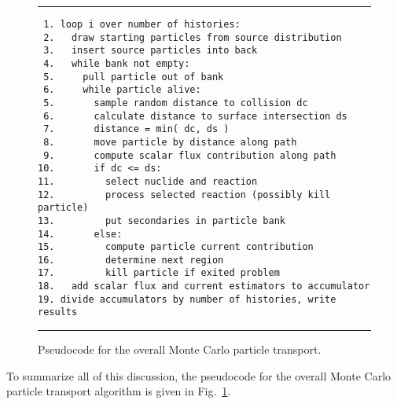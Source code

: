 \begin{figure}[tb!]
\begin{center}
\noindent \rule{\textwidth}{1pt}
\begin{verbatim}
 1. loop i over number of histories:
 2.   draw starting particles from source distribution
 3.   insert source particles into back
 4.   while bank not empty:
 5.     pull particle out of bank
 6.     while particle alive:
 5.       sample random distance to collision dc
 6.       calculate distance to surface intersection ds
 7.       distance = min( dc, ds )
 8.       move particle by distance along path
 9.       compute scalar flux contribution along path
10.       if dc <= ds:        
11.         select nuclide and reaction
12.         process selected reaction (possibly kill particle)
13.         put secondaries in particle bank
14.       else:
15.         compute particle current contribution
16.         determine next region
17.         kill particle if exited problem
18.   add scalar flux and current estimators to accumulator   
19. divide accumulators by number of histories, write results
\end{verbatim}
\rule{\textwidth}{1pt}
\caption{Pseudocode for the overall Monte Carlo particle transport.}
\label{Fig:probability_monteCarloTransportAlgorithm}
\end{center}
\end{figure}

To summarize all of this discussion, the pseudocode for the overall Monte Carlo particle transport algorithm is given in Fig.~\ref{Fig:probability_monteCarloTransportAlgorithm}.







